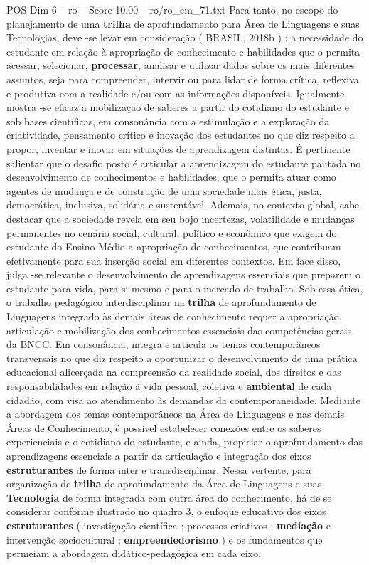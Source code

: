 \begin{textsample}{POS Dim 6 – ro – Score 10.00 – ro/ro\_em\_71.txt}
Para tanto, no escopo do planejamento de uma \textbf{trilha} de aprofundamento para Área de Linguagens e suas Tecnologias, deve -se levar em consideração ( BRASIL, 2018b ) : a necessidade do estudante em relação à apropriação de conhecimento e habilidades que o permita acessar, selecionar, \textbf{processar}, analisar e utilizar dados sobre os mais diferentes assuntos, seja para compreender, intervir ou para lidar de forma crítica, reflexiva e produtiva com a realidade e/ou com as informações disponíveis.
Igualmente, mostra -se eficaz a mobilização de saberes a partir do cotidiano do estudante e sob bases científicas, em consonância com a estimulação e a exploração da criatividade, pensamento crítico e inovação dos estudantes no que diz respeito a propor, inventar e inovar em situações de aprendizagem distintas.
É pertinente salientar que o desafio posto é articular a aprendizagem do estudante pautada no desenvolvimento de conhecimentos e habilidades, que o permita atuar como agentes de mudança e de construção de uma sociedade mais ética, justa, democrática, inclusiva, solidária e sustentável.
Ademais, no contexto global, cabe destacar que a sociedade revela em seu bojo incertezas, volatilidade e mudanças permanentes no cenário social, cultural, político e econômico que exigem do estudante do Ensino Médio a apropriação de conhecimentos, que contribuam efetivamente para sua inserção social em diferentes contextos.
Em face disso, julga -se relevante o desenvolvimento de aprendizagens essenciais que preparem o estudante para vida, para si mesmo e para o mercado de trabalho.
Sob essa ótica, o trabalho pedagógico interdisciplinar na \textbf{trilha} de aprofundamento de Linguagens integrado às demais áreas de conhecimento requer a apropriação, articulação e mobilização dos conhecimentos essenciais das competências gerais da BNCC.
Em consonância, integra e articula os temas contemporâneos transversais no que diz respeito a oportunizar o desenvolvimento de uma prática educacional alicerçada na compreensão da realidade social, dos direitos e das responsabilidades em relação à vida pessoal, coletiva e \textbf{ambiental} de cada cidadão, com visa ao atendimento às demandas da contemporaneidade.
Mediante a abordagem dos temas contemporâneos na Área de Linguagens e nas demais Áreas de Conhecimento, é possível estabelecer conexões entre os saberes experienciais e o cotidiano do estudante, e ainda, propiciar o aprofundamento das aprendizagens essenciais a partir da articulação e integração dos eixos \textbf{estruturantes} de forma inter e transdisciplinar.
Nessa vertente, para organização de \textbf{trilha} de aprofundamento da Área de Linguagens e suas \textbf{Tecnologia} de forma integrada com outra área do conhecimento, há de se considerar conforme ilustrado no quadro 3, o enfoque educativo dos eixos \textbf{estruturantes} ( investigação científica ; processos criativos ; \textbf{mediação} e intervenção sociocultural ; \textbf{empreendedorismo} ) e os fundamentos que permeiam a abordagem didático-pedagógica em cada eixo.

\end{textsample}
